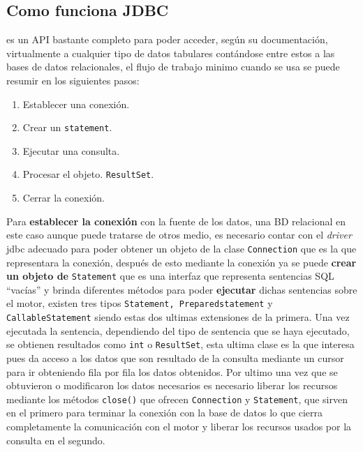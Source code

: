 \subsection{Como funciona JDBC}
\jd es un API bastante completo para poder acceder, según su documentación, virtualmente a cualquier tipo de datos tabulares contándose entre estos a las bases de datos relacionales, el flujo de trabajo minimo cuando se usa \jd se puede resumir en los siguientes pasos:
%
\begin{enumerate}
\item Establecer una conexión. %
\item Crear un \verb=statement=. %
\item Ejecutar una consulta. %
\item Procesar el objeto. \verb=ResultSet=. %
\item Cerrar la conexión. %
\end{enumerate}

Para \textbf{establecer la conexión} con la  fuente de los datos, una BD relacional en este caso aunque puede tratarse de otros medio, es necesario contar con el \textit{driver} jdbc adecuado para poder obtener un objeto de la clase \verb=Connection= que es la que representara la conexión, después de esto mediante la conexión ya se puede \textbf{crear un objeto de} \verb=Statement= que es una interfaz que representa sentencias SQL ``vacías'' y brinda diferentes métodos para poder \textbf{ejecutar} dichas sentencias sobre el motor, existen tres tipos \verb=Statement, Preparedstatement= y \verb=CallableStatement= siendo estas dos ultimas extensiones de la primera. Una vez ejecutada la sentencia, dependiendo del tipo de sentencia que se haya ejecutado, se obtienen resultados como \verb=int= o \verb=ResultSet=, esta ultima clase es la que interesa pues da acceso a los datos que son resultado de la consulta mediante un cursor para ir obteniendo fila por fila los datos obtenidos. Por ultimo una vez que se obtuvieron o modificaron los datos necesarios es necesario liberar los recursos mediante los métodos \verb=close()= que ofrecen \verb=Connection= y \verb=Statement=,  que sirven en el primero para terminar la conexión con la base de datos lo que cierra completamente la comunicación con el motor y liberar los recursos usados por la consulta en el segundo\citep{java:jdbc:tutorial}.

